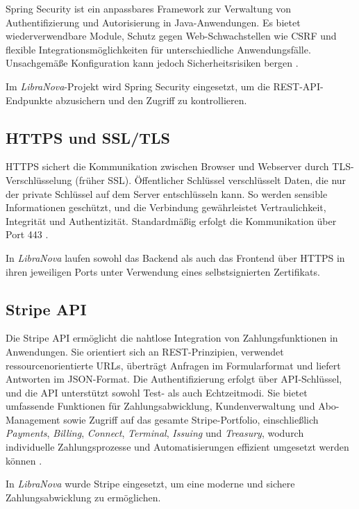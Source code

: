 Spring Security ist ein anpassbares Framework zur Verwaltung von Authentifizierung und Autorisierung in Java-Anwendungen. Es bietet wiederverwendbare Module, Schutz gegen Web-Schwachstellen wie CSRF und flexible Integrationsmöglichkeiten für unterschiedliche Anwendungsfälle. Unsachgemäße Konfiguration kann jedoch Sicherheitsrisiken bergen  \cite{SPRNGSECURITY2025}.

\noindent Im \textit{LibraNova}-Projekt wird Spring Security eingesetzt, um die REST-API-Endpunkte abzusichern und den Zugriff zu kontrollieren.

\subsection{HTTPS und SSL/TLS}

HTTPS sichert die Kommunikation zwischen Browser und Webserver durch TLS-Verschlüsselung (früher SSL). Öffentlicher Schlüssel verschlüsselt Daten, die nur der private Schlüssel auf dem Server entschlüsseln kann. So werden sensible Informationen geschützt, und die Verbindung gewährleistet Vertraulichkeit, Integrität und Authentizität. Standardmäßig erfolgt die Kommunikation über Port 443 \cite{HTTPS2025}. 

\noindent In \textit{LibraNova} laufen sowohl das Backend als auch das Frontend über HTTPS in ihren jeweiligen Ports unter Verwendung eines selbstsignierten Zertifikats.

\subsection{Stripe API}

Die Stripe API ermöglicht die nahtlose Integration von Zahlungsfunktionen in Anwendungen. Sie orientiert sich an REST-Prinzipien, verwendet ressourcenorientierte URLs, überträgt Anfragen im Formularformat und liefert Antworten im JSON-Format. Die Authentifizierung erfolgt über API-Schlüssel, und die API unterstützt sowohl Test- als auch Echtzeitmodi. Sie bietet umfassende Funktionen für Zahlungsabwicklung, Kundenverwaltung und Abo-Management sowie Zugriff auf das gesamte Stripe-Portfolio, einschließlich \textit{Payments}, \textit{Billing}, \textit{Connect}, \textit{Terminal}, \textit{Issuing} und \textit{Treasury}, wodurch individuelle Zahlungsprozesse und Automatisierungen effizient umgesetzt werden können \cite{STRIPEAPI2025}.

\noindent In  \textit{LibraNova} wurde Stripe eingesetzt, um eine moderne und sichere Zahlungsabwicklung zu ermöglichen.

